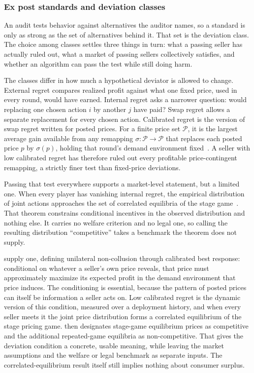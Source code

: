 \subsubsection{Ex post standards and deviation classes}
An audit tests behavior against alternatives the auditor names, so a standard is only
as strong as the set of alternatives behind it. That set is the deviation class. The choice among
classes settles three things in turn: what a passing seller has actually ruled out,
what a market of passing sellers collectively satisfies, and whether an algorithm can
pass the test while still doing harm.

The classes differ in how much a hypothetical deviator is allowed to change. External
regret compares realized profit against what one fixed price, used in every round,
would have earned. Internal regret asks a narrower question: would replacing one
chosen action $i$ by another $j$ have paid? Swap regret allows a separate replacement
for every chosen action. Calibrated regret is the version of swap regret written for
posted prices. For a finite price set $\mathcal{P}$, it is the largest average gain
available from any remapping $\sigma:\mathcal{P}\rightarrow\mathcal{P}$ that replaces
each posted price $p$ by $\sigma(p)$, holding that round's demand environment
fixed~\citep{HartlineLongZhang2024}. A seller with low calibrated regret has therefore
ruled out every profitable price-contingent remapping, a strictly finer test than
fixed-price deviations.

Passing that test everywhere supports a market-level statement, but a limited one. When
every player has vanishing internal regret, the empirical distribution of joint
actions approaches the set of correlated equilibria of the stage
game~\citep{FosterVohra1997,HartMasColell2000,BlumMansour2007}. That theorem
constrains conditional incentives in the observed distribution and nothing else. It
carries no welfare criterion and no legal one, so calling the resulting distribution
``competitive'' takes a benchmark the theorem does not supply.

\citet{HartlineLongZhang2024} supply one, defining unilateral non-collusion through
calibrated best response: conditional on whatever a seller's own price reveals, that
price must approximately maximize its expected profit in the demand environment that
price induces. The conditioning is essential, because the pattern of posted prices can
itself be information a seller acts on. Low calibrated regret is the dynamic version
of this condition, measured over a deployment history, and when every seller meets it
the joint price distribution forms a correlated equilibrium of the stage pricing game.
\citet{Hartline2026} then designates stage-game equilibrium prices as competitive and
the additional repeated-game equilibria as non-competitive. That gives the deviation
condition a concrete, usable meaning, while leaving the market assumptions and the welfare or legal benchmark as separate inputs. The correlated-equilibrium
result itself still implies nothing about consumer surplus.

